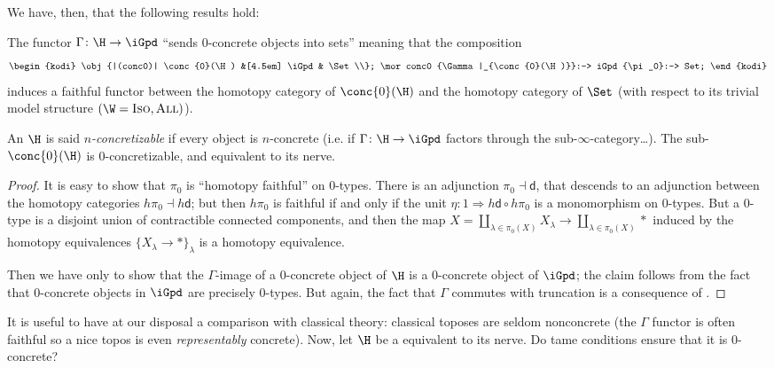 \documentclass[12pt]{amsart}
\begin{document}
We have, then, that the following results hold:
\begin{proposition}
The functor $\Gamma \colon \H \to \iGpd$ ``sends 0-concrete objects into sets'' meaning that the composition
\[
\begin{kodi}
\obj{|(conc0)| \conc{0}(\H) &[4.5em] \iGpd & \Set\\};
\mor conc0 {\Gamma|_{\conc{0}(\H)}}:-> iGpd {\pi_0}:-> Set;
\end{kodi}
\]
induces a faithful functor between the homotopy category of $\conc{0}(\H)$ and the homotopy category of $\Set$ (with respect to its trivial model structure $(\W=\textsc{Iso}, \textsc{All})$).

An \inftop $\H$ is said \emph{$n$-concretizable} if every object is $n$-concrete (i.e. if $\Gamma \colon \H\to \iGpd$ factors through the sub-$\infty$-category\dots). The sub-\inftop $\conc{0}(\H)$ is 0-concretizable, and equivalent to its nerve.
\end{proposition}
\begin{proof}
It is easy to show that $\pi_0$ is ``homotopy faithful'' on 0-types. There is an adjunction $\pi_0 \dashv \textsf{d}$, that descends to an adjunction between the homotopy categories $h\pi_0\dashv h\textsf{d}$; but then $h\pi_0$ is faithful if and only if the unit $\eta \colon 1 \Rightarrow h\textsf{d}\circ h\pi_0$ is a monomorphism on 0-types. But a  0-type is a disjoint union of contractible connected components, and then the map $X = \coprod_{\lambda \in \pi_0(X)} X_\lambda \longrightarrow \coprod_{\lambda \in \pi_0(X)}*$ induced by the homotopy equivalences $\{X_\lambda\to *\}_\lambda$ is a homotopy equivalence.

Then we have only to show that the $\Gamma$-image of a 0-concrete object of $\H$ is a 0-concrete object of $\iGpd$; the claim follows from the fact that 0-concrete objects in $\iGpd$ are precisely 0-types. But again, the fact that $\Gamma$ commutes with truncation is a consequence of \cite[???]{HTT}.
\end{proof}
It is useful to have at our disposal a comparison with classical theory: classical toposes are seldom nonconcrete (the $\Gamma$ functor is often faithful so a nice topos is even \emph{representably} concrete). Now, let $\H$ be a \inftop equivalent to its nerve. Do tame conditions ensure that it is 0-concrete?
\end{document}

